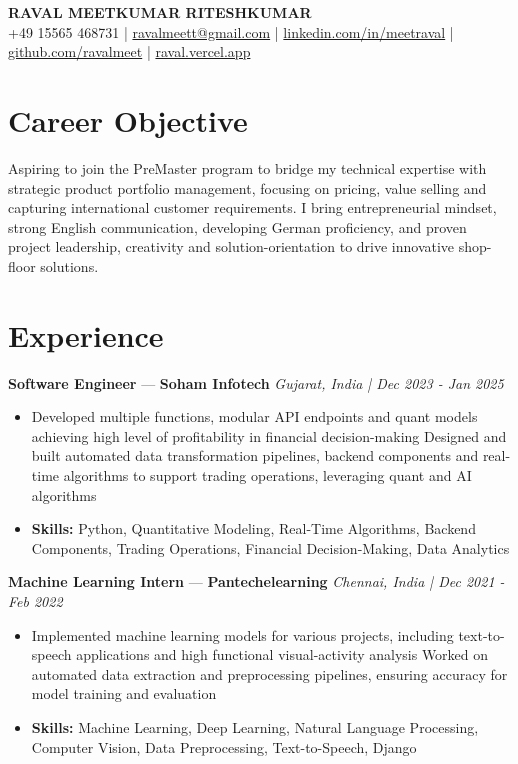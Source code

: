 \documentclass[a4paper,10pt]{article}
\begin{document}
\begin{center}
  {\Large\bfseries RAVAL MEETKUMAR RITESHKUMAR}\\[2pt]
  {\small +49 15565 468731 \;|\; \href{mailto:ravalmeett@gmail.com}{ravalmeett@gmail.com} \;|\; \href{https://www.linkedin.com/in/meetraval/}{linkedin.com/in/meetraval} \;|\; \href{https://github.com/ravalmeet}{github.com/ravalmeet} \;|\; \href{https://raval.vercel.app/}{raval.vercel.app}}
\end{center}
\vspace{-3pt}

\section*{Career Objective}
Aspiring to join the PreMaster program to bridge my technical expertise with strategic product portfolio management, focusing on pricing, value selling and capturing international customer requirements. I bring entrepreneurial mindset, strong English communication, developing German proficiency, and proven project leadership, creativity and solution-orientation to drive innovative shop-floor solutions.\par

\section*{Experience}
\textbf{Software Engineer} — \textbf{Soham Infotech} \hfill \textit{Gujarat, India \;|\; Dec 2023 - Jan 2025}\par
\vspace{1pt}
\begin{itemize}
  \item Developed multiple functions, modular API endpoints and quant models achieving high level of profitability in financial decision-making Designed and built automated data transformation pipelines, backend components and real-time algorithms to support trading operations, leveraging quant and AI algorithms
  \item \textbf{Skills:} Python, Quantitative Modeling, Real-Time Algorithms, Backend Components, Trading Operations, Financial Decision-Making, Data Analytics
\end{itemize}
\vspace{3pt}
\textbf{Machine Learning Intern} — \textbf{Pantechelearning} \hfill \textit{Chennai, India \;|\; Dec 2021 - Feb 2022}\par
\vspace{1pt}
\begin{itemize}
  \item Implemented machine learning models for various projects, including text-to-speech applications and high functional visual-activity analysis Worked on automated data extraction and preprocessing pipelines, ensuring accuracy for model training and evaluation
  \item \textbf{Skills:} Machine Learning, Deep Learning, Natural Language Processing, Computer Vision, Data Preprocessing, Text-to-Speech, Django
\end{itemize}
\end{document}
